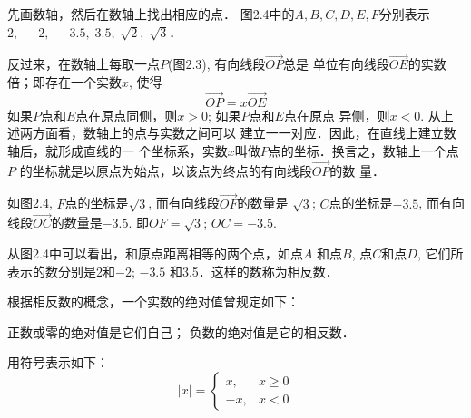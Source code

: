 \begin{solution}
    先画数轴，然后在数轴上找出相应的点．
图2.4中的$A,B,C,D,E,F$分别表示$2,\; -2,\; -3.5,\; 
3.5,\; \sqrt{2},\; \sqrt{3}$．

\begin{figure}[htp]
    \centering
{}
    \caption{}
\end{figure}
\end{solution}


反过来，在数轴上每取一点$P$(图2.3), 有向线段$\Vec{OP}$总是
单位有向线段$\Vec{OE}$的实数倍；即存在一个实数$x$, 使得
\[\Vec{OP}=x\Vec{OE} \]
如果$P$点和$E$点在原点同侧，则$x>0$; 如果$P$点和$E$点在原点
异侧，则$x<0$. 从上述两方面看，数轴上的点与实数之间可以
建立一一对应．因此，在直线上建立数轴后，就形成直线的一
个坐标系，实数$x$叫做$P$点的坐标．换言之，数轴上一个点$P$
的坐标就是以原点为始点，以该点为终点的有向线段$\Vec{OP}$的数
量．

如图2.4, $F$点的坐标是$\sqrt{3}$, 而有向线段$\Vec{OF}$的数量是
$\sqrt{3}$; $C$点的坐标是$-3.5$, 而有向线段$\Vec{OC}$的数量是$-3.5$. 即$OF=\sqrt{3}$; $OC=-3.5$.

从图2.4中可以看出，和原点距离相等的两个点，如点$A$
和点$B$, 点$C$和点$D$, 它们所表示的数分别是2和$-2$; $-3.5$
和3.5．这样的数称为相反数．

根据相反数的概念，一个实数的绝对值曾规定如下：
\begin{blk}{}
    正数或零的绝对值是它们自己；
负数的绝对值是它的相反数．
\end{blk}

用符号表示如下：
\[|x|=\begin{cases}
    x, & x\ge 0\\
    -x, & x<0
\end{cases}\]

